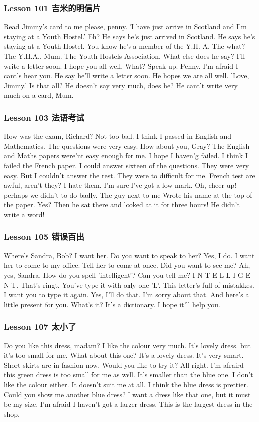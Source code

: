 \documentclass[11pt]{ctexart}
\begin{document}
\subsubsection{Lesson 101 吉米的明信片}
\label{sec:org415bc2f}
Read Jimmy's card to me please, penny.
'I have just arrive in Scotland and I'm staying at a Youth Hostel.'
Eh?
He says he's just arrived in Scotland.
He says he's staying at a Youth Hostel.
You know he's a member of the Y.H. A.
The what?
The Y.H.A., Mum.
The Youth Hostels Association.
What else does he say?
I'll write a letter soon.
I hope you all well.
What? Speak up. Penny.
I'm afraid I cant's hear you.
He say he'll write a letter soon.
He hopes we are all well.
'Love, Jimmy.'
Is that all?
He doesn't say very much, does he?
He cant't write very much on a card, Mum.
\subsubsection{Lesson 103 法语考试}
\label{sec:org7eeb577}
How was the exam, Richard?
Not too bad.
I think I passed in English and Mathematics.
The questions were very easy.
How about you, Gray?
The English and Maths papers were'nt easy enough for me.
I hope I haven'g failed.
I think I failed the French paper.
I could answer sixteen of the questions.
They were very easy.
But I couldn't answer the rest.
They were to difficult for me.
French test are awful, aren't they?
I hate them.
I'm sure I've got a low mark.
Oh, cheer up!
perhaps we didn't to do badly.
The guy next to me Wrote his name at the top of the paper.
Yes?
Then he sat there and looked at it for three hours!
He didn't write a word!
\subsubsection{Lesson 105 错误百出}
\label{sec:orgd47c42b}
Where's Sandra, Bob?
I want her.
Do you want to speak to her?
Yes, I do. I want her to come to my office.
Tell her to come at once.
Did you want to see me?
Ah, yes, Sandra.
How do you spell 'intelligent'?
Can you tell me?
I-N-T-E-L-L-I-G-E-N-T.
That's ringt. You've type it with only one 'L'.
This letter's full of mistakkes.
I want you to type it again.
Yes, I'll do that.
I'm sorry about that.
And here's a little present for you.
What's it?
It's a dictionary.
I hope it'll help you.
\subsubsection{Lesson 107 太小了}
\label{sec:org8c53365}
Do you like this dress, madam?
I like the colour very much.
It's lovely dress.
but it's too small for me.
What about this one? It's a lovely dress.
It's very smart.
Short skirts are in fashion now.
Would you like to try it?
All right.
I'm afraird this green dress is too small for me as well.
It's smaller than the blue one.
I don't like the colour either.
It doesn't suit me at all.
I think the blue dress is prettier.
Could you show me another blue dress?
I want a dress like that one,
but it must be my size.
I'm afraid I haven't got a larger dress.
This is the largest dress in the shop.
\end{document}
